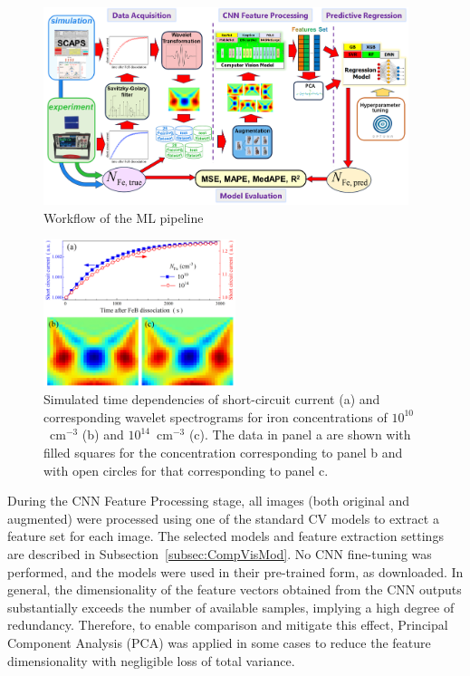 \documentclass[10pt]{iopart}
\begin{document}
\begin{figure}
\includegraphics[width=0.95\textwidth]{Fig1}
\caption{\label{Fig1}
Workflow of the ML pipeline
}%
\end{figure}

\begin{figure}
\includegraphics[width=0.5\textwidth]{Fig2}
\caption{\label{Fig2}
Simulated time dependencies of short-circuit current (a)
and corresponding wavelet spectrograms for iron concentrations
of $10^{10}$~cm$^{-3}$ (b) and $10^{14}$~cm$^{-3}$ (c).
The data in panel a are shown with filled squares for the concentration corresponding to panel b
and with open circles for that corresponding to panel c.
}%
\end{figure}


During the CNN Feature Processing stage, all images (both original and augmented) were processed using one of the standard CV models
to extract a feature set for each image.
The selected models and feature extraction settings are described in Subsection~\ref{subsec:CompVisMod}.
No CNN fine-tuning was performed, and the models were used in their pre-trained form, as downloaded.
In general, the dimensionality of the feature vectors obtained from the CNN outputs substantially exceeds the number of available samples,
implying a high degree of redundancy.
Therefore, to enable comparison and mitigate this effect, Principal Component Analysis (PCA) was applied in some cases
to reduce the feature dimensionality with negligible loss of total variance.
\end{document}
